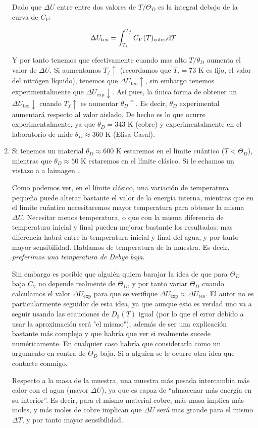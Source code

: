 \begin{enumerate}[label=\alph*)]
	      Dado que $\Delta U$ entre entre dos valores de $T/\Theta_D$ es la integral debajo de la curva de $C_V$:

	      \[
		      \Delta U_{\text{teo}} = \int_{T_i}^{T_f} C_V(T)_{\text{cobre}} \mathrm{d} T
	      \]

	      Y por tanto tenemos que efectivamente cuando mas alto $T/\theta_D$ aumenta el valor de $\Delta U$. Si aumentamos $T_f \uparrow$ (recordamos que $T_i=73$ K es fijo, el valor del nitrógen líquido), tenemos que $\Delta U_{\text{teo}} \uparrow$, sin embargo tenemos experimentalmente que $\Delta U_{\exp} \downarrow$. Así pues, la única forma de obtener un $\Delta U_{\text{teo}} \downarrow$ cuando $T_f \uparrow$ es aumentar $\theta_D \uparrow$. Es decir, $\theta_D$ experimental aumentará respecto al valor aislado. De hecho es lo que ocurre experimentalmente, ya que $\theta_D=343$ K (cobre) y experimentalmente en el laboratorio de mide $\theta_D \approx 360$ K (Elisa Casal).

	\item Si tenemos un material $\theta_D\approx 600$ K estaremos en el límite cuántico ($T<\Theta_D$), mientras que $\theta_D \approx 50$ K estaremos en el límite clásico. Si le echamos un vistazo a a laimagen .

	Como podemos ver, en el límite clásico, una variación de temperatura pequeña puede alterar bastante el valor de la energía interna, mientras que en el límite cuántico necesitaremos mayor temperatura para obtener la misma $\Delta U$. Necesitar menos temperatura, o que con la misma diferencia de temperatura inicial y final pueden mejorar bastante los resultados: mas diferencia habrá entre la temperatura inicial y final del agua, y por tanto mayor sensibilidad. Hablamos de temperatura de la muestra. Es decir, \textit{preferimos una temperatura de Debye baja}.

	Sin embargo es posible que alguién quiera barajar la idea de que para $\Theta_D$ baja $C_V$ no depende realmente de $\Theta_D$, y por tanto variar $\Theta_D$ cuando calculamos el valor $\Delta U_{\exp}$ para que se verifique $\Delta U_{\exp}\approx \Delta U_{\text{teo}}$. El autor no es particularmente seguidor de esta idea, ya que aunque esto es verdad uno va a seguir usando las ecauciones de $D_3(T)$ igual (por lo que el error debido a usar la aproximación será "el mismo"), además de ser una explicación bastante más compleja y que habría que ver si realmente sucede numéricamente. En cualquier caso habría que considerarla como un argumento en contra de $\Theta_D$ baja. Si a alguien se le ocurre otra idea que contacte conmigo.


	Respecto a la masa de la muestra, una muestra más pesada intercambia más calor con el agua (mayor $\Delta U$), ya que es capaz de ``almacenar más energía en su interior''. Es decir, para el mismo material cobre, más masa implica más moles, y más moles de cobre implican que $\Delta U$ será mas grande para el mismo $\Delta T$, y por tanto mayor sensibilidad.
\end{enumerate}

